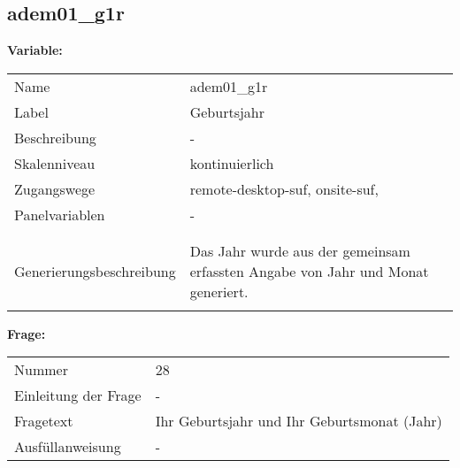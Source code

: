 	
	
	\subsection{adem01\_g1r}
	\label{subSection:adem01_g1r}

	\noindent\textbf{Variable:}\\
		\begin{tabular}{lL{11.3cm}}
			\label{tableVariable:adem01_g1r}
			Name & adem01\_g1r \\
			Label & Geburtsjahr \\
			Beschreibung & - \\
			Skalenniveau & kontinuierlich \\
			Zugangswege &
				remote-desktop-suf,
				onsite-suf,
 \\
			Panelvariablen & -
			 \\
			 \\
 \\
					Generierungsbeschreibung & Das Jahr wurde aus der gemeinsam erfassten Angabe von Jahr und Monat generiert. 
				 \\	
			 \\
		\end{tabular}

		\vspace*{1 cm}
		\noindent\textbf{Frage:}\\
		\begin{tabular}{lL{11.3cm}}
			\label{tableQuestion:adem01_g1r}
			Nummer & 28 \\
			Einleitung der Frage & - \\
			Fragetext & Ihr Geburtsjahr und Ihr Geburtsmonat (Jahr) \\
			Ausfüllanweisung & - \\
		\end{tabular}




